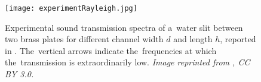 
\begin{figure}
\begin{center}
\texttt{[image: experimentRayleigh.jpg]}
\caption{Experimental sound transmission spectra of a~water slit between two brass plates for different channel width $d$ and length $h$, reported in \cite{channel1}. The~vertical arrows indicate the~frequencies at which the~transmission is extraordinarily low. \textit{Image reprinted from \cite{channel1}, CC BY 3.0.}}
\label{fig:experimentRayleigh}
\end{center}
\end{figure}

